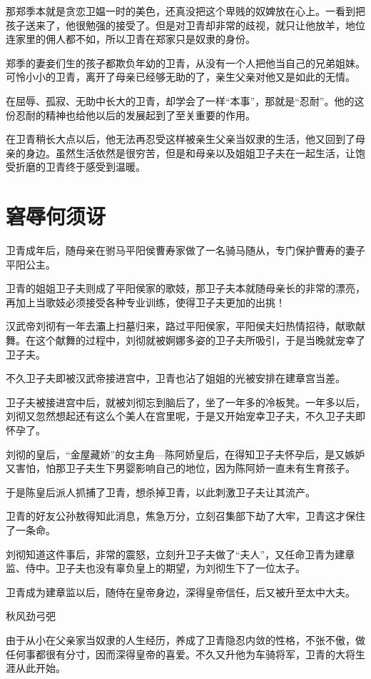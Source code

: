 \documentclass[UTF8,cap,nofonts,openany,twoside]{ctexbook}
\begin{document}
那郑季本就是贪恋卫媪一时的美色，还真没把这个卑贱的奴婢放在心上。一看到把孩子送来了，他很勉强的接受了。但是对卫青却非常的歧视，就只让他放羊，地位连家里的佣人都不如，所以卫青在郑家只是奴隶的身份。

郑季的妻妾们生的孩子都欺负年幼的卫青，从没有一个人把他当自己的兄弟姐妹。可怜小小的卫青，离开了母亲已经够无助的了，亲生父亲对他又是如此的无情。

在屈辱、孤寂、无助中长大的卫青，却学会了一样“本事”，那就是“忍耐”。他的这份忍耐的精神也给他以后的发展起到了至关重要的作用。

在卫青稍长大点以后，他无法再忍受这样被亲生父亲当奴隶的生活，他又回到了母亲的身边。虽然生活依然是很穷苦，但是和母亲以及姐姐卫子夫在一起生活，让饱受折磨的卫青终于感受到温暖。

\chapter{窘辱何须讶}

卫青成年后，随母亲在驸马平阳侯曹寿家做了一名骑马随从，专门保护曹寿的妻子平阳公主。

卫青的姐姐卫子夫则成了平阳侯家的歌妓，那卫子夫本就随母亲长的非常的漂亮，再加上当歌妓必须接受各种专业训练，使得卫子夫更加的出挑！

汉武帝刘彻有一年去灞上扫墓归来，路过平阳侯家，平阳侯夫妇热情招待，献歌献舞。在这个献舞的过程中，刘彻就被婀娜多姿的卫子夫所吸引，于是当晚就宠幸了卫子夫。

不久卫子夫即被汉武帝接进宫中，卫青也沾了姐姐的光被安排在建章宫当差。

卫子夫被接进宫中后，就被刘彻忘到脑后了，坐了一年多的冷板凳。一年多以后，刘彻又忽然想起还有这么个美人在宫里呢，于是又开始宠幸卫子夫，不久卫子夫即怀孕了。

刘彻的皇后，“金屋藏娇”的女主角---陈阿娇皇后，在得知卫子夫怀孕后，是又嫉妒又害怕，怕那卫子夫生下男婴影响自己的地位，因为陈阿娇一直未有生育孩子。

于是陈皇后派人抓捕了卫青，想杀掉卫青，以此刺激卫子夫让其流产。

卫青的好友公孙敖得知此消息，焦急万分，立刻召集部下劫了大牢，卫青这才保住了一条命。

刘彻知道这件事后，非常的震怒，立刻升卫子夫做了“夫人”，又任命卫青为建章监、侍中。卫子夫也没有辜负皇上的期望，为刘彻生下了一位太子。

卫青成为建章监以后，随侍在皇帝身边，深得皇帝信任，后又被升至太中大夫。

秋风劲弓弝

由于从小在父亲家当奴隶的人生经历，养成了卫青隐忍内敛的性格，不张不傲，做任何事都很有分寸，因而深得皇帝的喜爱。不久又升他为车骑将军，卫青的大将生涯从此开始。
\end{document}
